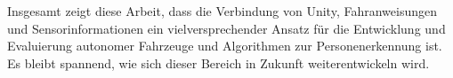 Insgesamt zeigt diese Arbeit, dass die Verbindung von Unity, Fahranweisungen und Sensorinformationen ein vielversprechender Ansatz für die Entwicklung und Evaluierung autonomer Fahrzeuge und Algorithmen zur Personenerkennung ist. Es bleibt spannend, wie sich dieser Bereich in Zukunft weiterentwickeln wird.\\




